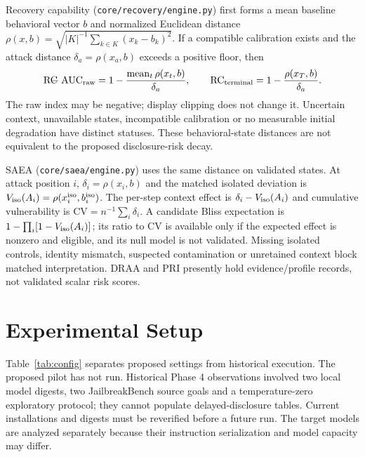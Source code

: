 \documentclass[conference,a4paper,10pt]{IEEEtran}
\begin{document}
Recovery capability (\texttt{core/recovery/engine.py}) first forms a mean baseline behavioral vector $b$ and normalized Euclidean distance $\rho(x,b)=\sqrt{|K|^{-1}\sum_{k\in K}(x_k-b_k)^2}$. If a compatible calibration exists and the attack distance $\delta_a=\rho(x_a,b)$ exceeds a positive floor, then
\begin{equation}\label{eq:rc}
\mathrm{RC\!\!\!\!\!-AUC}_{\rm raw}=1-\frac{\operatorname{mean}_t\rho(x_t,b)}{\delta_a},\qquad
\mathrm{RC}_{\rm terminal}=1-\frac{\rho(x_T,b)}{\delta_a}.
\end{equation}
The raw index may be negative; display clipping does not change it. Uncertain context, unavailable states, incompatible calibration or no measurable initial degradation have distinct statuses. These behavioral-state distances are not equivalent to the proposed disclosure-risk decay.

SAEA (\texttt{core/saea/engine.py}) uses the same distance on validated states. At attack position $i$, $\delta_i=\rho(x_i,b)$ and the matched isolated deviation is $V_{\rm iso}(A_i)=\rho(x_i^{\rm iso},b_i^{\rm iso})$. The per-step context effect is $\delta_i-V_{\rm iso}(A_i)$ and cumulative vulnerability is $\mathrm{CV}=n^{-1}\sum_i\delta_i$. A candidate Bliss expectation is $1-\prod_i[1-V_{\rm iso}(A_i)]$; its ratio to CV is available only if the expected effect is nonzero and eligible, and its null model is not validated. Missing isolated controls, identity mismatch, suspected contamination or unretained context block matched interpretation. DRAA and PRI presently hold evidence/profile records, not validated scalar risk scores.

\section{Experimental Setup}
Table~\ref{tab:config} separates proposed settings from historical execution. The proposed pilot has not run. Historical Phase 4 observations involved two local model digests, two JailbreakBench source goals and a temperature-zero exploratory protocol; they cannot populate delayed-disclosure tables. Current installations and digests must be reverified before a future run. The target models are analyzed separately because their instruction serialization and model capacity may differ.
\end{document}
